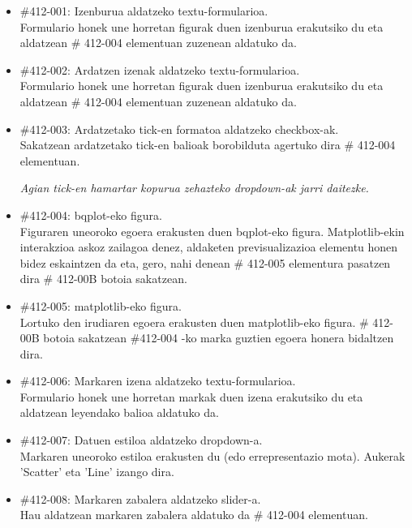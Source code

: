 \documentclass[10pt,a4paper]{article}
\let\nf\normalfont %
\newcommand{\cf}{\normalfont\sffamily}
\begin{document}
\begin{itemize}

\item \cf \#412-001: Izenburua aldatzeko textu-formularioa.
\\
\nf Formulario honek une horretan figurak duen izenburua erakutsiko du eta aldatzean \cf \# 412-004 \nf elementuan zuzenean aldatuko da.

\item \cf \#412-002: Ardatzen izenak aldatzeko textu-formularioa.
\\
\nf Formulario honek une horretan figurak duen izenburua erakutsiko du eta aldatzean \cf \# 412-004 \nf elementuan zuzenean aldatuko da.

\item \cf \#412-003: Ardatzetako tick-en formatoa aldatzeko checkbox-ak.
\\
\nf Sakatzean ardatzetako tick-en balioak borobilduta agertuko dira \cf \# 412-004 \nf elementuan.

\textit{Agian tick-en hamartar kopurua zehazteko dropdown-ak jarri daitezke.}

\item \cf \#412-004: bqplot-eko figura.
\\
\nf Figuraren uneoroko egoera erakusten duen bqplot-eko figura. Matplotlib-ekin interakzioa askoz zailagoa denez, aldaketen previsualizazioa elementu honen bidez eskaintzen da eta, gero, nahi denean \cf \# 412-005 \nf elementura pasatzen dira \cf \# 412-00B \nf botoia sakatzean.

\item \cf \#412-005: matplotlib-eko figura.
\\
\nf Lortuko den irudiaren egoera erakusten duen matplotlib-eko figura. \cf \# 412-00B \nf botoia sakatzean \cf \#412-004 \nf -ko marka guztien egoera honera bidaltzen dira.

\item \cf \#412-006: Markaren izena aldatzeko textu-formularioa.
\\
\nf Formulario honek une horretan markak duen izena erakutsiko du eta aldatzean leyendako balioa aldatuko da.

\item \cf \#412-007: Datuen estiloa aldatzeko dropdown-a.
\\
\nf Markaren uneoroko estiloa erakusten du (edo errepresentazio mota). Aukerak 'Scatter' eta 'Line' izango dira.
\\

\item \cf \#412-008: Markaren zabalera aldatzeko slider-a.
\\
\nf Hau aldatzean markaren zabalera aldatuko da \cf \# 412-004 \nf elementuan.
\\


\end{itemize}
\end{document}
